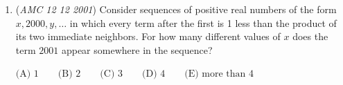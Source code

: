 \begin{enumerate}
 $\text{(A) }54^\circ \qquad \text{(B) }60^\circ \qquad \text{(C) }72^\circ \qquad \text{(D) }75^\circ \qquad \text{(E) }90^\circ$


	\item (\textit{AMC 12 12 2001}) Consider sequences of positive real numbers of the form $x, 2000, y, \dots$ in which every term after the first is 1 less than the product of its two immediate neighbors. For how many different values of $x$ does the term $2001$ appear somewhere in the sequence?


 $\text{(A) }1 \qquad \text{(B) }2 \qquad \text{(C) }3 \qquad \text{(D) }4 \qquad \text{(E) more than }4$


\end{enumerate}